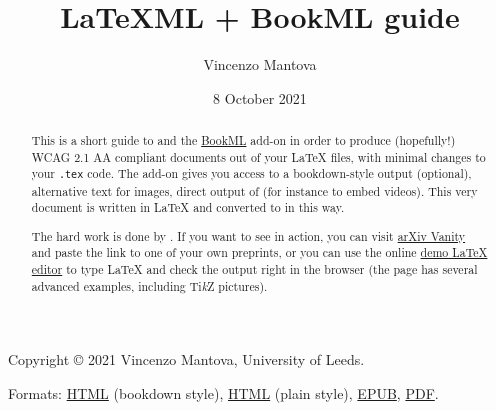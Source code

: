 \documentclass[a4paper]{article}
\title{LaTeXML + BookML guide}
\author{Vincenzo Mantova}
\date{8 October 2021}
\def\tikzname{Ti\emph{k}Z}
\theoremstyle{definition}
\begin{document}
\begin{lxFooter}
  Copyright \copyright{} 2021 Vincenzo Mantova, University of Leeds.
\end{lxFooter}
\fancyfoot[C]{}
\fancyfoot[R]{\thepage}
\pagestyle{fancy}


\maketitle

\begin{abstract}
  This is a short guide to \LaTeXML{} and the \href{https://vlmantova.github.io/bookml/}{BookML} add-on in order to produce (hopefully!) WCAG 2.1 AA compliant documents out of your \LaTeX{} files, with minimal changes to your \verb|.tex| code. The add-on gives you access to a bookdown-style output (optional), alternative text for images, direct output of \HTML{} (for instance to embed videos). This very document is written in \LaTeX{} and converted to \HTML{} in this way.

  The hard work is done by \LaTeXML{}. If you want to see \LaTeXML{} in action, you can visit \href{https://www.arxiv-vanity.com/}{arXiv Vanity} and paste the link to one of your own preprints, or you can use the online \href{https://latexml.mathweb.org/editor}{demo \LaTeX{} editor} to type \LaTeX{} and check the \HTML{} output right in the browser (the page has several advanced examples, including \tikzname{} pictures).
\end{abstract}

\begin{center}
  Formats: \href{https://minerva.leeds.ac.uk/bbcswebdav/courses/201920_MAPS_MM8863/latexmlleeds/index.html}{HTML} (bookdown style), \href{https://minerva.leeds.ac.uk/bbcswebdav/courses/201920_MAPS_MM8863/latexmlleeds/index.plain.html}{HTML} (plain style), \href{https://minerva.leeds.ac.uk/bbcswebdav/courses/201920_MAPS_MM8863/latexmlleeds/LaTeXML-Leeds.epub}{EPUB}, \href{https://minerva.leeds.ac.uk/bbcswebdav/courses/201920_MAPS_MM8863/latexmlleeds/LaTeXML-Leeds.pdf}{PDF}.
\end{center}
\end{document}
